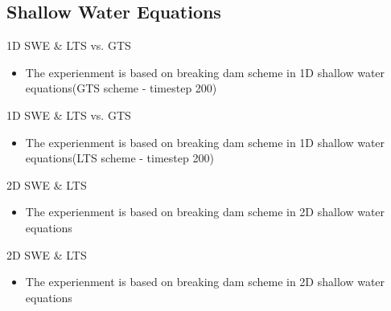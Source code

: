 \documentclass{beamer}
\begin{document}
\subsection{Shallow Water Equations}
\begin{frame}{1D SWE \& LTS vs. GTS}
\begin{itemize}
\item The experienment is based on breaking dam scheme in 1D shallow water equations(GTS scheme - timestep 200)\\
\end{itemize}
\begin{center}
\end{center}
\end{frame}
\begin{frame}{1D SWE \& LTS vs. GTS}
\begin{itemize}
\item The experienment is based on breaking dam scheme in 1D shallow water equations(LTS scheme - timestep 200)\\
\end{itemize}
\begin{center}
\end{center}
\end{frame}
\begin{frame}{2D SWE \& LTS}
\begin{itemize}
\item The experienment is based on breaking dam scheme in 2D shallow water equations\\
\begin{center}
\end{center}
\end{itemize}
\begin{center}
\end{center}
\end{frame}
\begin{frame}{2D SWE \& LTS}
\begin{itemize}
\item The experienment is based on breaking dam scheme in 2D shallow water equations\\
\begin{center}
\end{center}
\end{itemize}
\begin{center}
\end{center}
\end{frame}
\end{document}
